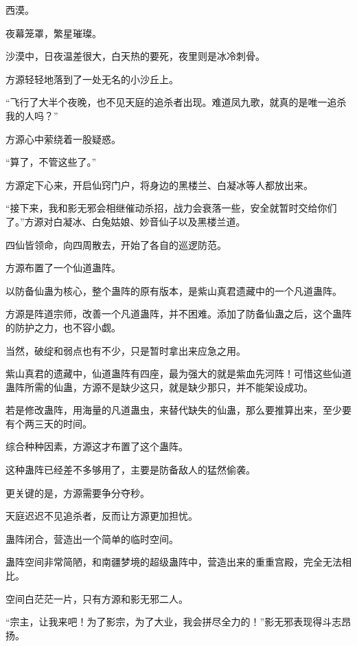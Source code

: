 
\begin{this_body}

西漠。

夜幕笼罩，繁星璀璨。

沙漠中，日夜温差很大，白天热的要死，夜里则是冰冷刺骨。

方源轻轻地落到了一处无名的小沙丘上。

“飞行了大半个夜晚，也不见天庭的追杀者出现。难道凤九歌，就真的是唯一追杀我的人吗？”

方源心中萦绕着一股疑惑。

“算了，不管这些了。”

方源定下心来，开启仙窍门户，将身边的黑楼兰、白凝冰等人都放出来。

“接下来，我和影无邪会相继催动杀招，战力会衰落一些，安全就暂时交给你们了。”方源对白凝冰、白兔姑娘、妙音仙子以及黑楼兰道。

四仙皆领命，向四周散去，开始了各自的巡逻防范。

方源布置了一个仙道蛊阵。

以防备仙蛊为核心，整个蛊阵的原有版本，是紫山真君遗藏中的一个凡道蛊阵。

方源是阵道宗师，改善一个凡道蛊阵，并不困难。添加了防备仙蛊之后，这个蛊阵的防护之力，也不容小觑。

当然，破绽和弱点也有不少，只是暂时拿出来应急之用。

紫山真君的遗藏中，仙道蛊阵有四座，最为强大的就是紫血先河阵！可惜这些仙道蛊阵所需的仙蛊，方源不是缺少这只，就是缺少那只，并不能架设成功。

若是修改蛊阵，用海量的凡道蛊虫，来替代缺失的仙蛊，那么要推算出来，至少要有个两三天的时间。

综合种种因素，方源这才布置了这个蛊阵。

这种蛊阵已经差不多够用了，主要是防备敌人的猛然偷袭。

更关键的是，方源需要争分夺秒。

天庭迟迟不见追杀者，反而让方源更加担忧。

蛊阵闭合，营造出一个简单的临时空间。

蛊阵空间非常简陋，和南疆梦境的超级蛊阵中，营造出来的重重宫殿，完全无法相比。

空间白茫茫一片，只有方源和影无邪二人。

“宗主，让我来吧！为了影宗，为了大业，我会拼尽全力的！”影无邪表现得斗志昂扬。


\end{this_body}
